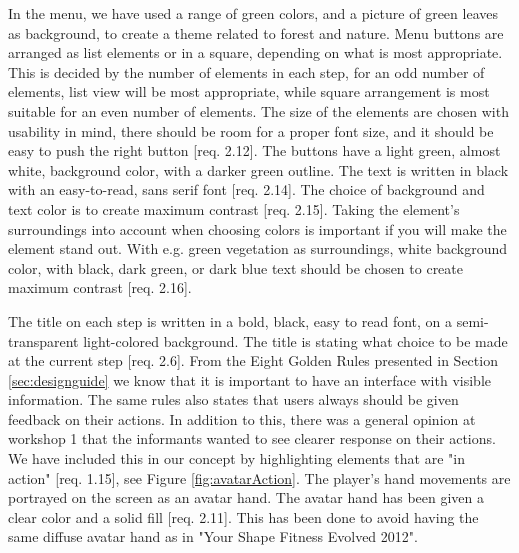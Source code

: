 In the menu, we have used a range of green colors, and a picture of green leaves as background, to create a theme related to forest and nature. Menu buttons are arranged as list elements or in a square, depending on what is most appropriate. This is decided by the number of elements in each step, for an odd number of elements, list view will be most appropriate, while square arrangement is most suitable for an even number of elements. The size of the elements are chosen with usability in mind, there should be room for a proper font size, and it should be easy to push the right button [req. 2.12]. The buttons have a light green, almost white, background color, with a darker green outline. The text is written in black with an easy-to-read, sans serif font [req. 2.14]. The choice of background and text color is to create maximum contrast [req. 2.15]. Taking the element's surroundings into account when choosing colors is important if you will make the element stand out. With e.g. green vegetation as surroundings, white background color, with black, dark green, or dark blue text should be chosen to create maximum contrast [req. 2.16]. 

The title on each step is written in a bold, black, easy to read font, on a semi-transparent light-colored background. The title is stating what choice to be made at the current step [req. 2.6]. From the Eight Golden Rules presented in Section \ref{sec:designguide} we know that it is important to have an interface with visible information. The same rules also states that users always should be given feedback on their actions. In addition to this, there was a general opinion at workshop 1 that the informants wanted to see clearer response on their actions. We have included this in our concept by highlighting elements that are "in action" [req. 1.15], see Figure \ref{fig:avatarAction}. The player's hand movements are portrayed on the screen as an avatar hand. The avatar hand has been given a clear color and a solid fill [req. 2.11]. This has been done to avoid having the same diffuse avatar hand as in "Your Shape Fitness Evolved 2012".  

